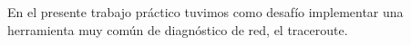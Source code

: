 En el presente trabajo práctico tuvimos como desafío implementar una herramienta muy común de diagnóstico de red, el traceroute.
